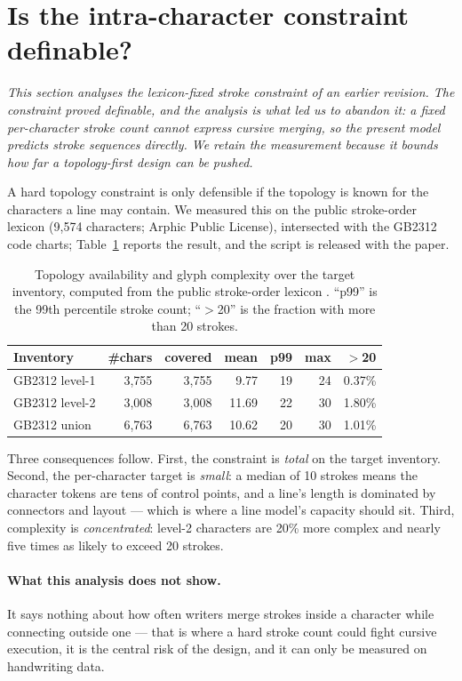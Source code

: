 \documentclass[conference]{IEEEtran}
\begin{document}
\section{Is the intra-character constraint definable?}
\label{sec:analysis}
\emph{This section analyses the lexicon-fixed stroke constraint of an earlier revision. The constraint proved definable, and the analysis is what led us to abandon it: a fixed per-character stroke count cannot express cursive merging, so the present model predicts stroke sequences directly. We retain the measurement because it bounds how far a topology-first design can be pushed.}

A hard topology constraint is only defensible if the topology is known for the characters a
line may contain. We measured this on the public stroke-order lexicon \cite{hanzi} (9{,}574
characters; Arphic Public License), intersected with the GB2312 code charts;
Table~\ref{tab:lexicon} reports the result, and the script is released with the paper.

\begin{table}[t]
\centering
\caption{Topology availability and glyph complexity over the target inventory, computed from
the public stroke-order lexicon \cite{hanzi}. ``p99'' is the 99th percentile stroke count;
``$>$20'' is the fraction with more than 20 strokes.}
\label{tab:lexicon}
\small
\begin{tabular}{@{}lrrrrrr@{}}
\toprule
Inventory & \#chars & covered & mean & p99 & max & $>$20 \\
\midrule
GB2312 level-1 & 3{,}755 & 3{,}755 & 9.77 & 19 & 24 & 0.37\% \\
GB2312 level-2 & 3{,}008 & 3{,}008 & 11.69 & 22 & 30 & 1.80\% \\
GB2312 union   & 6{,}763 & 6{,}763 & 10.62 & 20 & 30 & 1.01\% \\
\bottomrule
\end{tabular}
\end{table}

Three consequences follow. First, the constraint is \emph{total} on the target inventory.
Second, the per-character target is \emph{small}: a median of 10 strokes means the character
tokens are tens of control points, and a line's length is dominated by connectors and layout
--- which is where a line model's capacity should sit. Third, complexity is
\emph{concentrated}: level-2 characters are 20\% more complex and nearly five times as likely
to exceed 20 strokes.

\paragraph{What this analysis does not show.} It says nothing about how often writers merge
strokes inside a character while connecting outside one --- that is where a hard stroke count
could fight cursive execution, it is the central risk of the design, and it can only be
measured on handwriting data.
\end{document}
